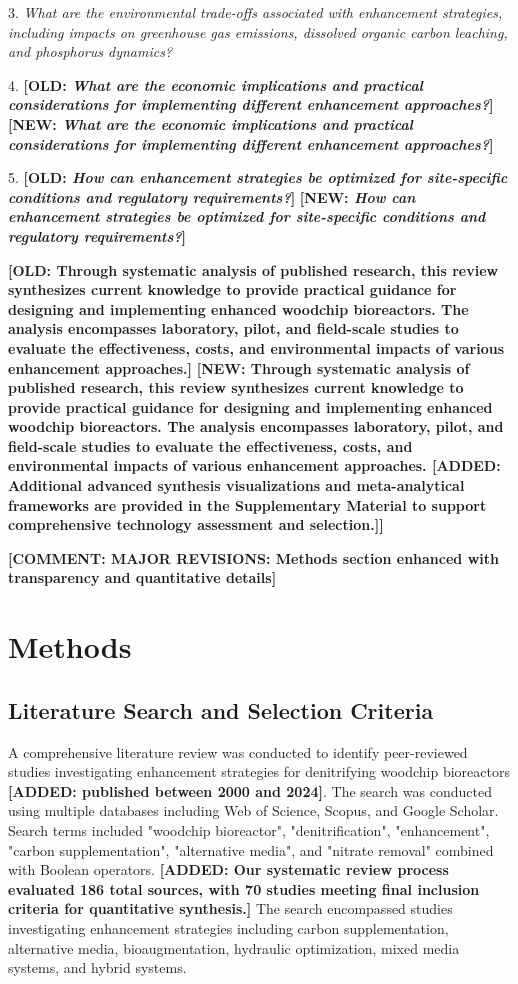 \documentclass[12pt,a4paper]{article}
\newcommand{\added}[1]{\textcolor{addedtext}{\textbf{[ADDED: #1]}}}
\newcommand{\replaced}[2]{\textcolor{deletedtext}{\textbf{[OLD: #1]}} \textcolor{replacedtext}{\textbf{[NEW: #2]}}}
\newcommand{\comment}[1]{\textcolor{commenttext}{\textbf{[COMMENT: #1]}}}
\begin{document}
3. \textit{What are the environmental trade-offs associated with enhancement strategies, including impacts on greenhouse gas emissions, dissolved organic carbon leaching, and phosphorus dynamics?}

4. \replaced{\textit{What are the economic implications and practical considerations for implementing different enhancement approaches?}}{\textit{What are the economic implications and practical considerations for implementing different enhancement approaches?}}

5. \replaced{\textit{How can enhancement strategies be optimized for site-specific conditions and regulatory requirements?}}{\textit{How can enhancement strategies be optimized for site-specific conditions and regulatory requirements?}}

\replaced{Through systematic analysis of published research, this review synthesizes current knowledge to provide practical guidance for designing and implementing enhanced woodchip bioreactors. The analysis encompasses laboratory, pilot, and field-scale studies to evaluate the effectiveness, costs, and environmental impacts of various enhancement approaches.}{Through systematic analysis of published research, this review synthesizes current knowledge to provide practical guidance for designing and implementing enhanced woodchip bioreactors. The analysis encompasses laboratory, pilot, and field-scale studies to evaluate the effectiveness, costs, and environmental impacts of various enhancement approaches. \added{Additional advanced synthesis visualizations and meta-analytical frameworks are provided in the Supplementary Material to support comprehensive technology assessment and selection.}}

\comment{MAJOR REVISIONS: Methods section enhanced with transparency and quantitative details}

\section{Methods}

\subsection{Literature Search and Selection Criteria}

A comprehensive literature review was conducted to identify peer-reviewed studies investigating enhancement strategies for denitrifying woodchip bioreactors \added{published between 2000 and 2024}. The search was conducted using multiple databases including Web of Science, Scopus, and Google Scholar. Search terms included "woodchip bioreactor", "denitrification", "enhancement", "carbon supplementation", "alternative media", and "nitrate removal" combined with Boolean operators. \added{Our systematic review process evaluated 186 total sources, with 70 studies meeting final inclusion criteria for quantitative synthesis.} The search encompassed studies investigating enhancement strategies including carbon supplementation, alternative media, bioaugmentation, hydraulic optimization, mixed media systems, and hybrid systems.
\end{document}

